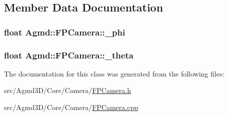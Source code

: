 \subsection{Member Data Documentation}
\hypertarget{class_agmd_1_1_f_p_camera_af41b36e11f74f14cf85e2cd8f56af913}{
\subsubsection[{\+\_\+phi}]{\setlength{\rightskip}{0pt plus 5cm}float Agmd\+::\+F\+P\+Camera\+::\+\_\+phi\hspace{0.3cm}{\ttfamily [protected]}}}\label{class_agmd_1_1_f_p_camera_af41b36e11f74f14cf85e2cd8f56af913}
\hypertarget{class_agmd_1_1_f_p_camera_a90ff4b852f05fc2136d29987f52689be}{
\subsubsection[{\+\_\+theta}]{\setlength{\rightskip}{0pt plus 5cm}float Agmd\+::\+F\+P\+Camera\+::\+\_\+theta\hspace{0.3cm}{\ttfamily [protected]}}}\label{class_agmd_1_1_f_p_camera_a90ff4b852f05fc2136d29987f52689be}


The documentation for this class was generated from the following files\+:\begin{DoxyCompactItemize}
\item 
src/\+Agmd3\+D/\+Core/\+Camera/\hyperlink{_f_p_camera_8h}{F\+P\+Camera.\+h}\item 
src/\+Agmd3\+D/\+Core/\+Camera/\hyperlink{_f_p_camera_8cpp}{F\+P\+Camera.\+cpp}\end{DoxyCompactItemize}
